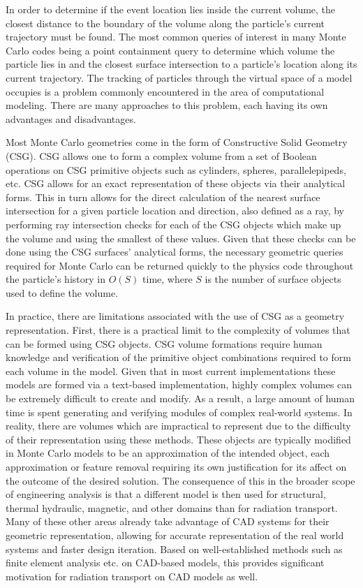 \documentclass[12pt, a4paper]{article}
\begin{document}
In order to determine if the event location lies inside the current volume, the closest distance to the boundary of the volume along the particle's current trajectory must be found. The most common queries of interest in many Monte Carlo codes being a point containment query to determine which volume the particle lies in and the closest surface intersection to a particle's location along its current trajectory. The tracking of particles through the virtual space of a model occupies is a problem commonly encountered in the area of computational modeling. There are many approaches to this problem, each having its own advantages and disadvantages.

Most Monte Carlo geometries come in the form of Constructive Solid Geometry (CSG). CSG allows one to form a complex volume from a set of Boolean operations on CSG primitive objects such as cylinders, spheres, parallelepipeds, etc. CSG allows for an exact representation of these objects via their analytical forms. This in turn allows for the direct calculation of the nearest surface intersection for a given particle location and direction, also defined as a ray, by performing ray intersection checks for each of the CSG objects which make up the volume and using the smallest of these values. Given that these checks can be done using the CSG surfaces' analytical forms, the necessary geometric queries required for Monte Carlo can be returned quickly to the physics code throughout the particle's history in $O(S)$ time, where $S$ is the number of surface objects used to define the volume.

In practice, there are limitations associated with the use of CSG as a geometry representation. First, there is a practical limit to the complexity of volumes that can be formed using CSG objects. CSG volume formations require human knowledge and verification of the primitive object combinations required to form each volume in the model. Given that in most current implementations these models are formed via a text-based implementation, highly complex volumes can be extremely difficult to create and modify. As a result, a large amount of human time is spent generating and verifying modules of complex real-world systems. In reality, there are volumes which are impractical to represent due to the difficulty of their representation using these methods. These objects are typically modified in Monte Carlo models to be an approximation of the intended object, each approximation or feature removal requiring its own justification for its affect on the outcome of the desired solution. The consequence of this in the broader scope of engineering analysis is that a different model is then used for structural, thermal hydraulic, magnetic, and other domains than for radiation transport. Many of these other areas already take advantage of CAD systems for their geometric representation, allowing for accurate representation of the real world systems and faster design iteration. Based on well-established methods such as finite element analysis etc. on CAD-based models, this provides significant motivation for radiation transport on CAD models as well.
\end{document}
